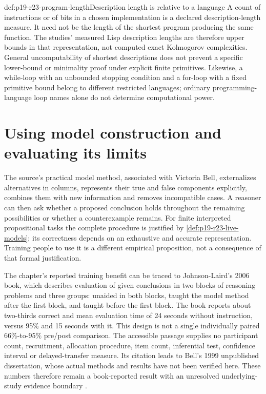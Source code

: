 \begin{proofboundary}{def:p19-r23-program-length}{Description length is relative to a language}
A count of instructions or of bits in a chosen implementation is a
declared description-length measure. It need not be the length of the
shortest program producing the same function. The studies' measured Lisp
description lengths are therefore upper bounds in that representation,
not computed exact Kolmogorov complexities. General uncomputability of
shortest descriptions does not prevent a specific lower-bound or
minimality proof under explicit finite primitives. Likewise, a
while-loop with an unbounded stopping condition and a for-loop with a
fixed primitive bound belong to different restricted languages; ordinary
programming-language loop names alone do not determine computational power.
\end{proofboundary}

\section{Using model construction and evaluating its limits}
\label{sec:p19-r23-use}

The source's practical model method, associated with Victoria Bell,
externalizes alternatives in columns, represents their true and false
components explicitly, combines them with new information and removes
incompatible cases. A reasoner can then ask whether a proposed conclusion
holds throughout the remaining possibilities or whether a counterexample
remains. For finite interpreted propositional tasks the complete
procedure is justified by \cref{def:p19-r23-live-models}; its correctness
depends on an exhaustive and accurate representation. Training people
to use it is a different empirical proposition, not a consequence of
that formal justification.

The chapter's reported training benefit can be traced to Johnson-Laird's
2006 book, which describes evaluation of given conclusions in two blocks
of reasoning problems and three groups: unaided in both blocks, taught
the model method after the first block, and taught before the first block.
The book reports about two-thirds correct and mean evaluation time of
24 seconds without instruction, versus 95\% and 15 seconds with it.
This design is not a single individually paired 66\%-to-95\% pre/post
comparison. The accessible passage supplies no participant count,
recruitment, allocation procedure, item count, inferential test,
confidence interval or delayed-transfer measure. Its citation leads to
Bell's 1999 unpublished dissertation, whose actual methods and results
have not been verified here. These numbers therefore remain a
book-reported result with an unresolved underlying-study evidence
boundary \cite[pp.~288,290]{JohnsonLaird2006HowWeReason}.

